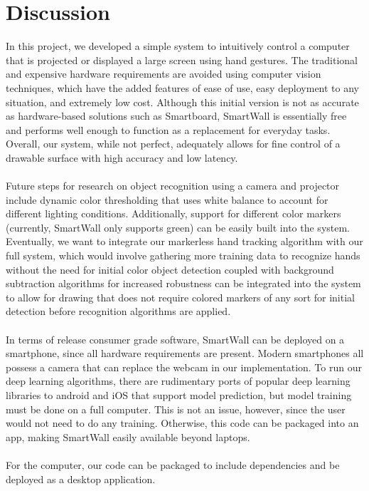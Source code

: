 \documentclass[twoside,twocolumn]{article}
\begin{document}
\section{Discussion}
In this project, we developed a simple system to intuitively control a computer that is projected or displayed a large screen using hand gestures. The traditional and expensive hardware requirements are avoided using computer vision techniques, which have the added features of ease of use, easy deployment to any situation, and extremely low cost. Although this initial version is not as accurate as hardware-based solutions such as Smartboard, SmartWall is essentially free and performs well enough to function as a replacement for everyday tasks. Overall, our system, while not perfect, adequately allows for fine control of a drawable surface with high accuracy and low latency.\\ \\ Future steps for research on object recognition using a camera and projector include dynamic color thresholding that uses white balance to account for different lighting conditions. Additionally, support for different color markers (currently, SmartWall only supports green) can be easily built into the system. Eventually, we want to integrate our markerless hand tracking algorithm with our full system, which would involve gathering more training data to recognize hands without the need for initial color object detection coupled with background subtraction algorithms for increased robustness can be integrated into the system to allow for drawing that does not require colored markers of any sort for initial detection before recognition algorithms are applied.\\ \\
In terms of release consumer grade software, SmartWall can be deployed on a smartphone, since all hardware requirements are present. Modern smartphones all possess a camera that can replace the webcam in our implementation. To run our deep learning algorithms, there are rudimentary ports of popular deep learning libraries to android and iOS that support model prediction, but model training must be done on a full computer. This is not an issue, however, since the user would not need to do any training. Otherwise, this code can be packaged into an app, making SmartWall easily available beyond laptops.\\ \\ For the computer, our code can be packaged to include dependencies and be deployed as a desktop application.
\end{document}
